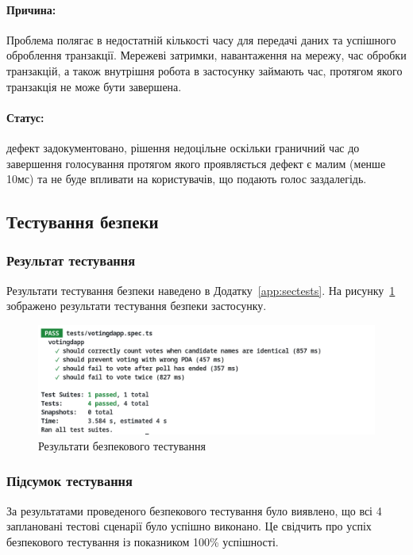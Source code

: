 \documentclass[14pt]{extreport}
\begin{document}
  \paragraph{Причина:} Проблема полягає в недостатній кількості часу для передачі даних та успішного оброблення транзакції. Мережеві затримки, навантаження на мережу, час обробки транзакцій, а також внутрішня робота в застосунку займають час, протягом якого транзакція не може бути завершена.

  \paragraph{Статус:} дефект задокументовано, рішення недоцільне оскільки граничний час до завершення голосування протягом якого проявляється дефект є малим (менше 10мс) та не буде впливати на користувачів, що подають голос заздалегідь.
  
  \subsection{Тестування безпеки}
  
  \subsubsection*{Результат тестування}
  
  Результати тестування безпеки наведено в Додатку~\ref{app:sectests}. На рисунку~\ref{fig:sectests} зображено результати тестування безпеки застосунку.

  \begin{figure}[H]
    \centering
    \includegraphics[width=\textwidth]{SecTests}
    \caption{Результати безпекового тестування}
    \label{fig:sectests}
  \end{figure}
  
  \subsubsection*{Підсумок тестування}
  
    За результатами проведеного безпекового тестування було виявлено, що всі 4 заплановані тестові сценарії було успішно виконано. Це свідчить про успіх безпекового тестування із показником 100\% успішності.
  
\end{document}
